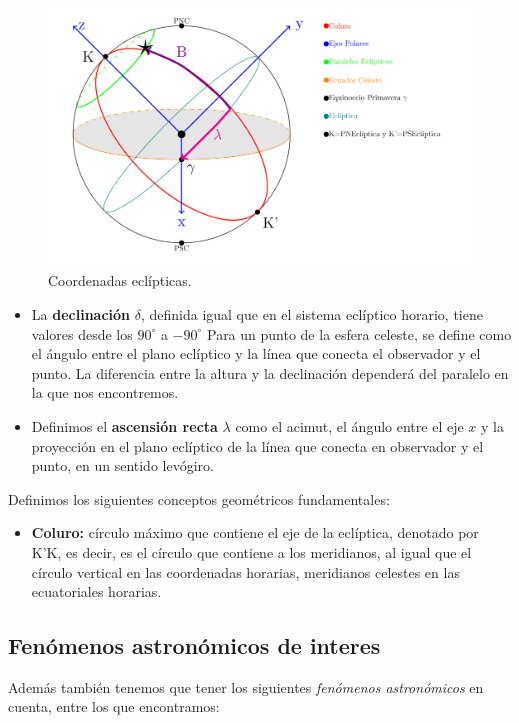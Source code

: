 \begin{figure}[h!] \centering
	\includegraphics[width=0.6\linewidth]{Cuerpo/Ch_01/Coordenadas_Eclipticas.png}
	\caption{Coordenadas eclípticas.%
	}
	\label{Fig:01-eclípticas}
\end{figure}

\begin{itemize}
	\item La \textbf{declinación} $\delta$, definida igual que en el sistema eclíptico horario, tiene valores desde los $90^\circ$ a $-90^\circ$ Para un punto de la esfera celeste, se define como el ángulo entre el plano eclíptico y la línea que conecta el observador y el punto. La diferencia entre la altura y la declinación dependerá del paralelo en la que nos encontremos.
	\item Definimos el \textbf{ascensión recta} $\lambda$ como el acimut, el ángulo entre el eje $x$ y la proyección en el plano eclíptico de la línea que conecta en observador y el punto, en un sentido levógiro.
\end{itemize}


Definimos los siguientes conceptos geométricos fundamentales: 

\begin{itemize}
	\item \textbf{Coluro:} círculo máximo que contiene el eje de la eclíptica, denotado por K'K, es decir, es el círculo que contiene a los meridianos, al igual que el círculo vertical en las coordenadas horarias, meridianos celestes en las ecuatoriales horarias. 
\end{itemize}

\subsection{Fenómenos astronómicos de interes}

Además también tenemos que tener los siguientes \textit{fenómenos astronómicos} en cuenta, entre los que encontramos:

